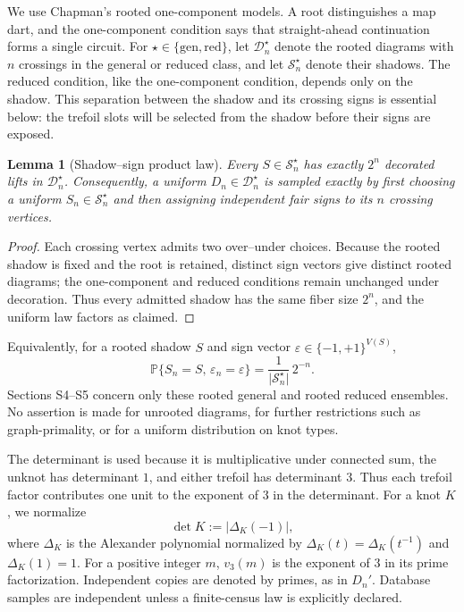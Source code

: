 \documentclass[9pt,twoside]{pnas-new}
\newtheorem{lemma}[theorem]{Lemma}
\theoremstyle{definition}
\theoremstyle{remark}
\renewcommand{\Pr}{\mathbb{P}}
\begin{document}
We use Chapman's rooted one-component models. A root distinguishes a map dart, and the one-component condition says that straight-ahead continuation forms a single circuit. For $\star\in\{\mathrm{gen},\mathrm{red}\}$, let $\mathcal D_n^{\star}$ denote the rooted diagrams with $n$ crossings in the general or reduced class, and let $\mathcal S_n^{\star}$ denote their shadows. The reduced condition, like the one-component condition, depends only on the shadow. This separation between the shadow and its crossing signs is essential below: the trefoil slots will be selected from the shadow before their signs are exposed.

\begin{lemma}[Shadow--sign product law]
\label{lem:shadow-sign-product}
Every $S\in\mathcal S_n^{\star}$ has exactly $2^n$ decorated lifts in $\mathcal D_n^{\star}$. Consequently, a uniform $D_n\in\mathcal D_n^{\star}$ is sampled exactly by first choosing a uniform $S_n\in\mathcal S_n^{\star}$ and then assigning independent fair signs to its $n$ crossing vertices.
\end{lemma}

\begin{proof}
Each crossing vertex admits two over--under choices. Because the rooted shadow is fixed and the root is retained, distinct sign vectors give distinct rooted diagrams; the one-component and reduced conditions remain unchanged under decoration. Thus every admitted shadow has the same fiber size $2^n$, and the uniform law factors as claimed.
\end{proof}

Equivalently, for a rooted shadow $S$ and sign vector $\varepsilon\in\{-1,+1\}^{V(S)}$,
\begin{equation}
 \Pr\{S_n=S,\,\varepsilon_n=\varepsilon\}
 =\frac{1}{\lvert\mathcal S_n^{\star}\rvert}\,2^{-n}.
 \label{eq:shadow-sign-product}
\end{equation}
Sections S4--S5 concern only these rooted general and rooted reduced ensembles. No assertion is made for unrooted diagrams, for further restrictions such as graph-primality, or for a uniform distribution on knot types.

The determinant is used because it is multiplicative under connected sum, the unknot has determinant $1$, and either trefoil has determinant $3$. Thus each trefoil factor contributes one unit to the exponent of $3$ in the determinant. For a knot $K$, we normalize
\[
 \det K:=\lvert\Delta_K(-1)\rvert,
\]
where $\Delta_K$ is the Alexander polynomial normalized by $\Delta_K(t)=\Delta_K(t^{-1})$ and $\Delta_K(1)=1$. For a positive integer $m$, $v_3(m)$ is the exponent of $3$ in its prime factorization. Independent copies are denoted by primes, as in $D_n'$. Database samples are independent unless a finite-census law is explicitly declared.
\end{document}
